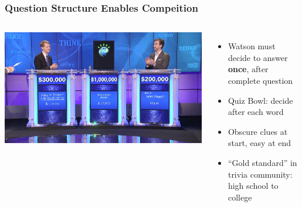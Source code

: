 \documentclass[xcolor=dvipsnames,xcolor=table]{beamer}
\newcommand{\gfxq}[2]{
\begin{center}
	\texttt{[image: qb/\#1]}
\end{center}
}
\begin{document}
\begin{frame}
	\frametitle{Question Structure Enables Compeition}

	\begin{columns}

		\includegraphics[width=1.0\linewidth]{qb/jeopardy}


		\begin{itemize}
                        \item Watson must decide to answer {\bf once}, after
                          complete question
                        \item Quiz Bowl: decide after each word
                        \item Obscure clues at start, easy at end
                        \item ``Gold standard'' in trivia community: high school to college
		\end{itemize}

	\end{columns}

      \end{frame}


\end{document}
